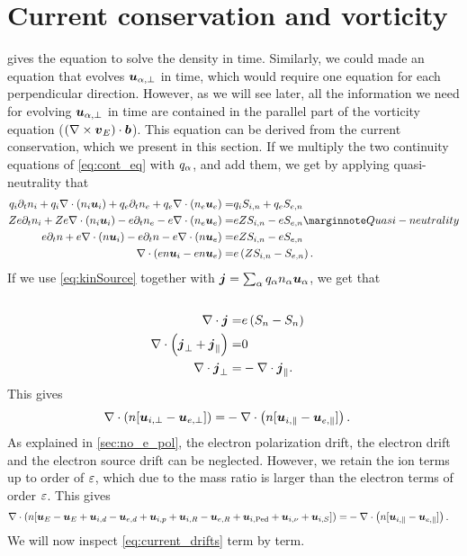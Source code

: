 \section{Current conservation and vorticity}
%
 gives the equation to solve the density in time.
Similarly, we could made an equation that evolves $\boldsymbol{u}_{\alpha,\perp}$ in time, which would require one equation for each perpendicular direction.
However, as we will see later, all the information we need for evolving $\boldsymbol{u}_{\alpha,\perp}$ in time are contained in the parallel part of the vorticity equation ($(\nabla\times \boldsymbol{v}_E)\cdot \boldsymbol{b}$).
This equation can be derived from the current conservation, which we present in this section.
If we multiply the two continuity equations of \cref{eq:cont_eq} with $q_\alpha$, and add them, we get by applying quasi-neutrality that
%
\begin{align*}
    q_i\partial_t n_i + q_i\div (n_i \ve{u}_i)
    + q_e\partial_t n_e + q_e\div (n_e \ve{u}_e)
    =&
    q_iS_{i,n} + q_eS_{e,n}
    \\
    Ze\partial_t n_i + Ze\div (n_i \ve{u}_i)
    - e\partial_t n_e - e\div (n_e \ve{u}_e)
    =&
    eZS_{i,n} - eS_{e,n}
    \note{Quasi-neutrality}
    \\
    e\partial_t n + e\div (n \ve{u}_i)
    - e\partial_t n - e\div (n \ve{u}_e)
    =&
    eZS_{i,n} - eS_{e,n}
    \\
    \div (en \ve{u}_i - en \ve{u}_e) =&
    e\L(ZS_{i,n} - S_{e,n}\R).
\end{align*}
%
If we use \cref{eq:kinSource} together with $\boldsymbol{j} = \sum_{\alpha}q_\alpha n_\alpha\boldsymbol{u}_\alpha$, we get that
%
\begin{align*}
    \\
    \nabla\cdot \boldsymbol{j} =&
    e\left(S_{n} - S_{n}\right)
    \\
    \nabla\cdot \left( \boldsymbol{j}_\perp + \boldsymbol{j}_\|\right)=& 0
    \\
    \nabla\cdot \boldsymbol{j}_\perp =& -\nabla\cdot \boldsymbol{j}_\|.
\end{align*}
%
This gives
%
\begin{align*}
    \nabla\cdot \left( n [\boldsymbol{u}_{i,\perp} - \boldsymbol{u}_{e,\perp}] \right) =&
    -\nabla\cdot \left(n [\boldsymbol{u}_{i,\|} - \boldsymbol{u}_{e,\|}]\right).
\end{align*}
%
As explained in \cref{sec:no_e_pol}, the electron polarization drift, the electron drift and the electron source drift can be neglected.
However, we retain the ion terms up to order of $\varepsilon$, which due to the mass ratio is larger than the electron terms of order $\varepsilon$.
This gives
%
\begin{align}
    \nabla\cdot \left( n [
   \boldsymbol{u}_{E} - \boldsymbol{u}_{E}
  +\boldsymbol{u}_{i,d} - \boldsymbol{u}_{e,d}
  +\boldsymbol{u}_{i,p}
  +\boldsymbol{u}_{i,R} - \boldsymbol{u}_{e,R}
  +\boldsymbol{u}_{i,\text{Ped}}
  +\boldsymbol{u}_{i,\nu}
  +\boldsymbol{u}_{i,S}
  ] \right) =&
  -\nabla\cdot \left(n [\boldsymbol{u}_{i,\|} - \boldsymbol{u}_{e,\|}]\right).
  \label{eq:current_drifts}
\end{align}
%
We will now inspect \cref{eq:current_drifts} term by term.


